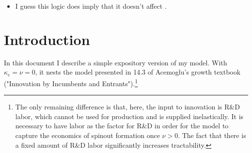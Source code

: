 \documentclass[12pt,english]{article}
\theoremstyle{remark}
\begin{document}
\begin{enumerate}
\begin{itemize}
\begin{itemize}
			\item This means that the effect on entry of spinouts (and hence the cannibalization effect on incumbents) increases faster than the wage discount R\&D workers are ready to accept.
			\item \textbf{Implication 1:} more incumbents will want to use non-competes in equilibrium
			\item \textbf{Implication 2:} non-competes will be more damaging in equilibrium, because they are more likely to prevent spinouts from working on ideas that actually expand the innovation possibilities frontier.
			\item This effect vanishes if instead of $(z_E + z_S)$ in the DRS term you have $(\chi_E z_E + \chi_S z_S)$. In that case, the rate of creative destruction does not depend on the entry of spinouts into R\&D as long as $z_E > 0$. The only contribution of spinout entry to welfare is through its reduction in the equilibrium labor allocation to R\&D (since they are more efficient than spinouts): this increases steady state consumption, directly increasing welfare, and thereby increases profits, increasing the overall incentive for R\&D and therefore growth. Incumbents don't care about spinout entry except due to the fact that it brings them closer to the mass of spinouts where the creative destruction rate actually starts to increase.
			\item How much of this is rendered incorrect after taking into account that the incumbent value function internalizes getting closer to the increased entry rate state? So that the value function will still be decreasing in $m$ for all $m$, even in the bullet point immediately preceding this one?  
			\item How much of this is due to the stark modeling assumption that there is one productivity level for entrants, one productivity level for spinouts?
		\end{itemize}
		\item I guess this logic does imply that it doesn't affect .
	\end{itemize}
\end{enumerate}

\section{Introduction}

In this document I describe a simple expository version of my model.  With $\kappa_e = \nu = 0$, it nests the model presented in 14.3 of Acemoglu's growth textbook ("Innovation by Incumbents and Entrants").\footnote{The only remaining difference is that, here, the input to innovation is R\&D labor, which cannot be used for production and is supplied inelastically. It is necessary to have labor as the factor for R\&D in order for the model to capture the economics of spinout formation once $\nu > 0$. The fact that there is a fixed amount of R\&D labor significantly increases tractability.}
\end{document}
